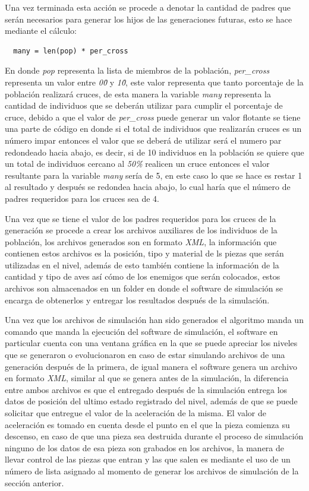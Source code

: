 Una vez terminada esta acción se procede a denotar la cantidad de padres que
serán necesarios para generar los hijos de las generaciones futuras, esto se
hace mediante el cálculo:
\begin{verbatim}
  many = len(pop) * per_cross
\end{verbatim}
En donde \textit{pop} representa la lista de miembros de la población,
\textit{per\_cross} representa un valor entre \textit{0\.0} y \textit{1\.0}, este
valor representa que tanto porcentaje de la población realizará cruces,
de esta manera la variable \textit{many} representa la cantidad de individuos
que se deberán utilizar para cumplir el porcentaje de cruce, debido a que el
valor de \textit{per\_cross} puede generar un valor flotante se tiene una parte
de código en donde si el total de individuos que realizarán cruces es un número
impar entonces el valor que se deberá de utilizar será el numero par redondeado
hacia abajo, es decir, si de 10 individuos en la población se quiere que un
total de individuos cercano al \textit{50\%} realicen un cruce entonces el valor
resultante para la variable \textit{many} sería de 5, en este caso lo que se
hace es restar 1 al resultado y después se redondea hacia abajo, lo cual haría
que el número de padres requeridos para los cruces sea de 4.

Una vez que se tiene el valor de los padres requeridos para los cruces de la
generación se procede a crear los archivos auxiliares de los individuos de la
población, los archivos generados son en formato \textit{XML}, la información
que contienen estos archivos es la posición, tipo y material de ls piezas que
serán utilizadas en el nivel, además de esto también contiene la información de
la cantidad y tipo de aves así cómo de los enemigos que serán colocados, estos
archivos son almacenados en un folder en donde el software de simulación se
encarga de obtenerlos y entregar los resultados después de la simulación.

Una vez que los archivos de simulación han sido generados el algoritmo manda un
comando que manda la ejecución del software de simulación, el software en
particular cuenta con una ventana gráfica en la que se puede apreciar los niveles
que se generaron o evolucionaron en caso de estar simulando archivos de una
generación después de la primera, de igual manera el software genera un archivo
en formato \textit{XML}, similar al que se genera antes de la simulación, la
diferencia entre ambos archivos es que el entregado después de la
simulación entrega los datos de posición del ultimo estado registrado del nivel,
además de que se puede solicitar que entregue el valor de la aceleración de la
misma. El valor de aceleración es tomado en cuenta desde el punto en el que la
pieza comienza su descenso, en caso de que una pieza sea destruida durante el
proceso de simulación ninguno de los datos de esa pieza son grabados en los
archivos, la manera de llevar control de las piezas que entran y las que salen
es mediante el uso de un número de lista asignado al momento de generar los
archivos de simulación de la sección anterior.

